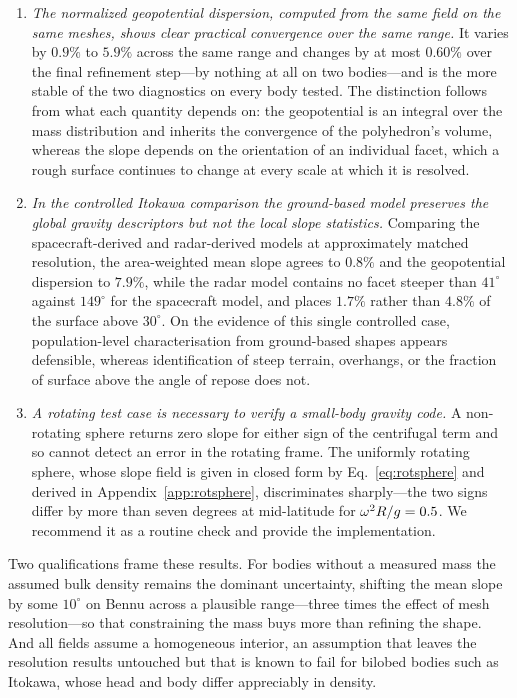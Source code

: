 \begin{enumerate}
\item \emph{The normalized geopotential dispersion, computed from the same
field on the same meshes, shows clear practical convergence over the same
range.} It varies by $0.9\%$ to $5.9\%$ across the
same range and changes by at most $0.60\%$ over the final refinement step---by
nothing at all on two bodies---and is the more stable of the two diagnostics on
every body tested. The distinction follows from what each quantity depends on:
the geopotential is an integral over the mass distribution and inherits the
convergence of the polyhedron's volume, whereas the slope depends on the
orientation of an individual facet, which a rough surface continues to change
at every scale at which it is resolved.

\item \emph{In the controlled Itokawa comparison the ground-based model
preserves the global gravity descriptors but not the local slope statistics.}
Comparing the spacecraft-derived and radar-derived models at approximately
matched resolution, the area-weighted mean slope agrees to $0.8\%$ and the
geopotential dispersion to $7.9\%$, while the radar model contains no facet
steeper than $41^{\circ}$ against $149^{\circ}$ for the spacecraft model, and
places $1.7\%$ rather than $4.8\%$ of the surface above $30^{\circ}$. On the
evidence of this single controlled case, population-level characterisation from
ground-based shapes appears defensible, whereas identification of steep terrain,
overhangs, or the fraction of surface above the angle of repose does not.

\item \emph{A rotating test case is necessary to verify a small-body gravity
code.} A non-rotating sphere returns zero slope for either sign of the
centrifugal term and so cannot detect an error in the rotating frame. The
uniformly rotating sphere, whose slope field is given in closed form by
Eq.~\eqref{eq:rotsphere} and derived in Appendix~\ref{app:rotsphere},
discriminates sharply---the two signs differ by more than seven degrees at
mid-latitude for $\omega^{2}R/g = 0.5$. We recommend it as a routine check
and provide the implementation.

\end{enumerate}

Two qualifications frame these results. For bodies without a measured mass the
assumed bulk density remains the dominant uncertainty, shifting the mean slope
by some $10^{\circ}$ on Bennu across a plausible range---three times the effect
of mesh resolution---so that constraining the mass buys more than refining the
shape. And all fields assume a homogeneous interior, an assumption that leaves
the resolution results untouched but that is known to fail for bilobed bodies
such as Itokawa, whose head and body differ appreciably in density.

